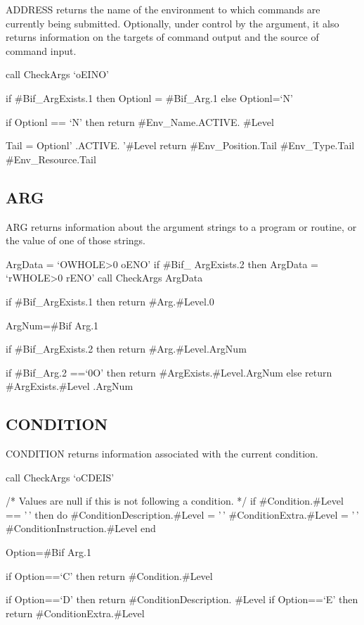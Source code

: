 ADDRESS returns the name of the environment to which commands are
currently being submitted. Optionally, under control by the argument, it
also returns information on the targets of command output and the source
of command input.

call CheckArgs `oEINO'

if \#Bif\_ArgExists.1 then Optionl = \#Bif\_Arg.1 else Optionl=`N'

if Optionl == `N' then return \#Env\_Name.ACTIVE. \#Level

Tail = Optionl' .ACTIVE. '\#Level return \#Env\_Position.Tail
\#Env\_Type.Tail \#Env\_Resource.Tail

\hypertarget{arg}{%
\subsection{ARG}\label{arg}}

ARG returns information about the argument strings to a program or
routine, or the value of one of those strings.

ArgData = `OWHOLE\textgreater0 oENO' if \#Bif\_ ArgExists.2 then ArgData
= `rWHOLE\textgreater0 rENO' call CheckArgs ArgData

if \#Bif\_ArgExists.1 then return \#Arg.\#Level.0

ArgNum=\#Bif Arg.1

if \#Bif\_ArgExists.2 then return \#Arg.\#Level.ArgNum

if \#Bif\_Arg.2 ==`0O' then return \#ArgExists.\#Level.ArgNum else
return \#ArgExists.\#Level .ArgNum

\hypertarget{condition}{%
\subsection{CONDITION}\label{condition}}

CONDITION returns information associated with the current condition.

call CheckArgs `oCDEIS'

/* Values are null if this is not following a condition. */ if
\#Condition.\#Level == '\,' then do \#ConditionDescription.\#Level =
'\,' \#ConditionExtra.\#Level = '\,' \#ConditionInstruction.\#Level end

Option=\#Bif Arg.1

if Option==`C' then return \#Condition.\#Level

if Option==`D' then return \#ConditionDescription. \#Level if
Option==`E' then return \#ConditionExtra.\#Level

